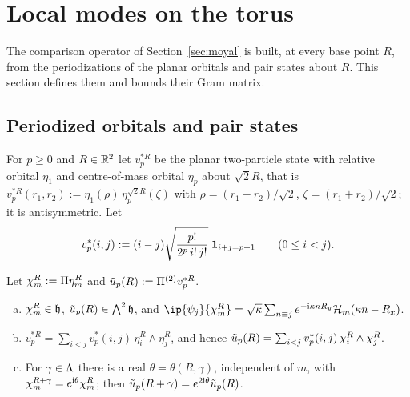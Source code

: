 \section{Local modes on the torus}\label{sec:local}

The comparison operator of Section~\ref{sec:moyal} is built, at every base point $R$, from the periodizations of the
planar orbitals and pair states about $R$. This section defines them and bounds their Gram matrix.

\subsection{Periodized orbitals and pair states}

For $p\ge0$ and $R\in\mathbb{R}^2$ let $v_p^{*R}$ be the planar two-particle state with relative orbital $\eta_1$ and centre-of-mass
orbital $\eta_p$ about $\sqrt2R$, that is $v_p^{*R}(r_1,r_2):=\eta_1(\rho)\,\eta_p^{\sqrt2R}(\zeta)$ with $\rho=(r_1-r_2)/\sqrt2$,
$\zeta=(r_1+r_2)/\sqrt2$; it is antisymmetric. Let
\[
v_p^*(i,j):=(i-j)\sqrt{\frac{p!}{2^p\,i!\,j!}}\;\mathbf{1}_{i+j=p+1}\qquad(0\le i<j).
\]

\begin{lemma}\label{lem:localmodes}
Let $\chi_m^R:=\Pi\eta_m^R$ and $\tilde u_p(R):=\Pi^{(2)}v_p^{*R}$.
\begin{enumerate}[(a)]
\item $\chi_m^R\in\mathfrak{h}$, $\tilde u_p(R)\in\bigwedge^2\mathfrak{h}$, and
$\ip{\psi_j}{\chi_m^R}=\sqrt\kappa\sum_{n\equiv j}e^{-\iu\kappa nR_y}\mathcal H_m(\kappa n-R_x)$.
\item $v_p^{*R}=\sum_{i<j}v_p^*(i,j)\,\eta_i^R\wedge\eta_j^R$, and hence $\tilde u_p(R)=\sum_{i<j}v_p^*(i,j)\,\chi_i^R\wedge\chi_j^R$.
\item For $\gamma\in\Lambda$ there is a real $\theta=\theta(R,\gamma)$, independent of $m$, with
$\chi_m^{R+\gamma}=e^{\mathrm{i}\theta}\chi_m^R$; then $\tilde u_p(R+\gamma)=e^{2\mathrm{i}\theta}\tilde u_p(R)$.
\end{enumerate}
\end{lemma}

